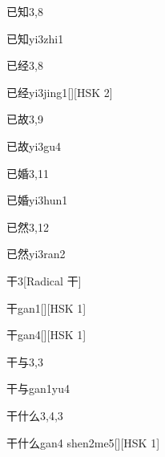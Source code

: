 \begin{entry}{已知}{3,8}
  \begin{phonetics}{已知}{yi3zhi1}
  \end{phonetics}
\end{entry}

\begin{entry}{已经}{3,8}
  \begin{phonetics}{已经}{yi3jing1}[][HSK 2]
  \end{phonetics}
\end{entry}

\begin{entry}{已故}{3,9}
  \begin{phonetics}{已故}{yi3gu4}
  \end{phonetics}
\end{entry}

\begin{entry}{已婚}{3,11}
  \begin{phonetics}{已婚}{yi3hun1}
  \end{phonetics}
\end{entry}

\begin{entry}{已然}{3,12}
  \begin{phonetics}{已然}{yi3ran2}
  \end{phonetics}
\end{entry}

\begin{entry}{干}{3}[Radical 干]
  \begin{phonetics}{干}{gan1}[][HSK 1]
  \end{phonetics}
  \begin{phonetics}{干}{gan4}[][HSK 1]
  \end{phonetics}
\end{entry}

\begin{entry}{干与}{3,3}
  \begin{phonetics}{干与}{gan1yu4}
  \end{phonetics}
\end{entry}

\begin{entry}{干什么}{3,4,3}
  \begin{phonetics}{干什么}{gan4 shen2me5}[][HSK 1]
  \end{phonetics}
\end{entry}

